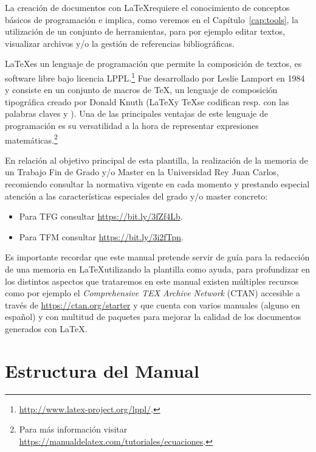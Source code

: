 \documentclass[twoside]{tfg-urjc}
\begin{document}
\cleardoublepage
{}
\setcounter{page}{1}

La creación de documentos con \LaTeX requiere el conocimiento de
conceptos básicos de programación e implica, como veremos en el
Capítulo~\ref{cap:tools}, la utilización de un conjunto de
herramientas, para por ejemplo editar textos, visualizar archivos
 y/o la gestión de referencias bibliográficas.

\LaTeX es un lenguaje de programación que permite la composición de
textos, es software libre bajo licencia
LPPL.\footnote{\url{http://www.latex-project.org/lppl/}.} Fue
desarrollado por Leslie Lamport en 1984 y consiste en un conjunto de
macros de \TeX, un lenguaje de composición tipográfica creado por
Donald Knuth (\LaTeX y \TeX se codifican resp. con las palabras claves
\code{\LaTeX} y \code{\TeX}). Una de las principales ventajas de este
lenguaje de programación es su versatilidad a la hora de representar
expresiones matemáticas.\footnote{Para más información visitar
  \url{https://manualdelatex.com/tutoriales/ecuaciones}.}

En relación al objetivo principal de esta plantilla, la realización de
la memoria de un Trabajo Fin de Grado y/o Master en la Universidad Rey
Juan Carlos, recomiendo consultar la normativa vigente en cada momento
y prestando especial atención a las características especiales del
grado y/o master concreto:

\begin{itemize}
\item Para TFG consultar
  \url{https://bit.ly/3fZf4Lb}.
\item Para TFM consultar
  \url{https://bit.ly/3i2fTpn}.
\end{itemize}

Es importante recordar que este manual pretende servir de guía para la
redacción de una memoria en \LaTeX utilizando la plantilla como ayuda,
para profundizar en los distintos aspectos que trataremos en este
manual existen múltiples recursos como por ejemplo el
\emph{Comprehensive TEX Archive Network} (CTAN) accesible a través de
\url{https://ctan.org/starter} y que cuenta con varios manuales
(alguno en español) y con multitud de paquetes para mejorar la calidad
de los documentos generados con \LaTeX.

\section{Estructura del Manual}
\label{sec:man}
\end{document}
